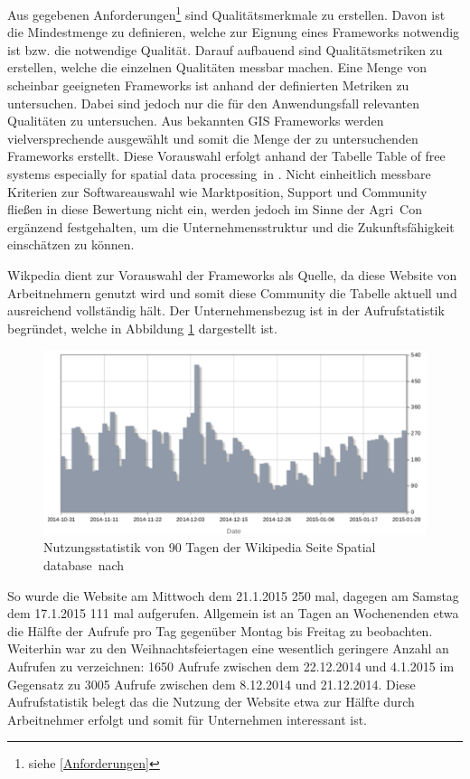 Aus gegebenen Anforderungen\footnote{siehe \ref{Anforderungen}} sind Qualitätsmerkmale zu erstellen.
Davon ist die Mindestmenge zu definieren, welche zur Eignung eines Frameworks notwendig ist bzw. die notwendige Qualität.
Darauf aufbauend sind Qualitätsmetriken zu erstellen, welche die einzelnen Qualitäten messbar machen.
Eine Menge von scheinbar geeigneten Frameworks ist anhand der definierten Metriken zu untersuchen.
Dabei sind jedoch nur die für den Anwendungsfall relevanten Qualitäten zu untersuchen.
Aus bekannten GIS Frameworks werden vielversprechende ausgewählt und somit die Menge der zu untersuchenden Frameworks erstellt.
\label{aufrufe-spatialdatabases}
Diese Vorauswahl erfolgt anhand der Tabelle \glqq Table of free systems especially for spatial data processing\grqq\ in \cite{website:wiki-spatialdatabase}.
Nicht einheitlich messbare Kriterien zur Softwareauswahl wie Marktposition, Support und Community fließen in diese Bewertung nicht ein, werden jedoch im Sinne der Agri~Con ergänzend festgehalten, um die Unternehmensstruktur und die Zukunftsfähigkeit einschätzen zu können.

Wikpedia dient zur Vorauswahl der Frameworks als Quelle, da diese Website von Arbeitnehmern genutzt wird und somit diese Community die Tabelle aktuell und ausreichend vollständig hält.
Der Unternehmensbezug ist in der Aufrufstatistik begründet, welche in Abbildung \ref{fig:wiki-usage-spatialdatabase} dargestellt ist.
\begin{figure}
\centering
\includegraphics[width=\textwidth]{Abbildungen/wiki-spatialdatabase-usage.pdf}
\caption[Nutzungsstatistik der Wikipedia Seite spatial database]{Nutzungsstatistik von 90 Tagen der Wikipedia Seite \glqq Spatial database\grqq\ nach \cite{website:wiki-usage-spatialdatabase}}
\label{fig:wiki-usage-spatialdatabase}
\end{figure}
So wurde die Website am Mittwoch dem 21.1.2015 250 mal, dagegen am Samstag dem 17.1.2015 111 mal aufgerufen.
Allgemein ist an Tagen an Wochenenden etwa die Hälfte der Aufrufe pro Tag gegenüber Montag bis Freitag zu beobachten.
Weiterhin war zu den Weihnachtsfeiertagen eine wesentlich geringere Anzahl an Aufrufen zu verzeichnen: 1650 Aufrufe zwischen dem 22.12.2014 und 4.1.2015 im Gegensatz zu 3005 Aufrufe zwischen dem 8.12.2014 und 21.12.2014.
Diese Aufrufstatistik belegt das die Nutzung der Website etwa zur Hälfte durch Arbeitnehmer erfolgt und somit für Unternehmen interessant ist.

